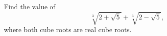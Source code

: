 Find the value of
\[
\sqrt[3]{2+\sqrt{5}}+\sqrt[3]{2-\sqrt{5}},
\]
where both cube roots are real cube roots.
